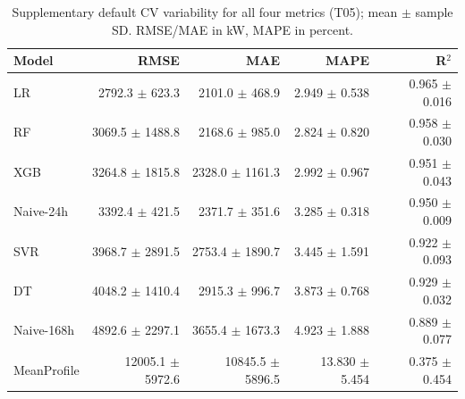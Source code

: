 \begin{table}[tbp]\centering\small
\caption{Supplementary default CV variability for all four metrics (T05); mean $\pm$ sample SD. RMSE/MAE in kW, MAPE in percent.}\label{tab:cv_variability}
\setlength{\tabcolsep}{4pt}
\begin{tabular}{lrrrr}
\toprule
Model & RMSE & MAE & MAPE & R$^2$ \\
\midrule
LR & \num{2792.3} $\pm$ \num{623.3} & \num{2101.0} $\pm$ \num{468.9} & \num{2.949} $\pm$ \num{0.538} & \num{0.965} $\pm$ \num{0.016} \\
RF & \num{3069.5} $\pm$ \num{1488.8} & \num{2168.6} $\pm$ \num{985.0} & \num{2.824} $\pm$ \num{0.820} & \num{0.958} $\pm$ \num{0.030} \\
XGB & \num{3264.8} $\pm$ \num{1815.8} & \num{2328.0} $\pm$ \num{1161.3} & \num{2.992} $\pm$ \num{0.967} & \num{0.951} $\pm$ \num{0.043} \\
Naive-24h & \num{3392.4} $\pm$ \num{421.5} & \num{2371.7} $\pm$ \num{351.6} & \num{3.285} $\pm$ \num{0.318} & \num{0.950} $\pm$ \num{0.009} \\
SVR & \num{3968.7} $\pm$ \num{2891.5} & \num{2753.4} $\pm$ \num{1890.7} & \num{3.445} $\pm$ \num{1.591} & \num{0.922} $\pm$ \num{0.093} \\
DT & \num{4048.2} $\pm$ \num{1410.4} & \num{2915.3} $\pm$ \num{996.7} & \num{3.873} $\pm$ \num{0.768} & \num{0.929} $\pm$ \num{0.032} \\
Naive-168h & \num{4892.6} $\pm$ \num{2297.1} & \num{3655.4} $\pm$ \num{1673.3} & \num{4.923} $\pm$ \num{1.888} & \num{0.889} $\pm$ \num{0.077} \\
MeanProfile & \num{12005.1} $\pm$ \num{5972.6} & \num{10845.5} $\pm$ \num{5896.5} & \num{13.830} $\pm$ \num{5.454} & \num{0.375} $\pm$ \num{0.454} \\
\bottomrule\end{tabular}
\end{table}
